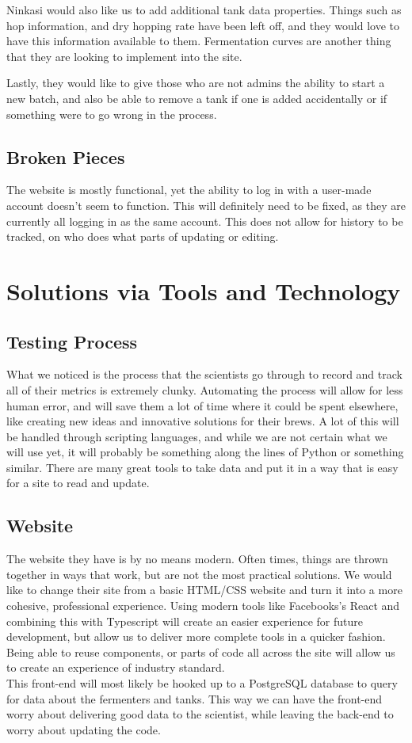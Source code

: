 \documentclass[10pt,peerreview]{IEEEtran}
\begin{document}
    Ninkasi would also like us to add additional tank data properties. Things such as hop information, and dry hopping rate have been left off, and they would love to have this information available to them. Fermentation curves are another thing that they are looking to implement into the site. 
    
    Lastly, they would like to give those who are not admins the ability to start a new batch, and also be able to remove a tank if one is added accidentally or if something were to go wrong in the process.
\subsection{Broken Pieces}
    The website is mostly functional, yet the ability to log in with a user-made account doesn't seem to function. This will definitely need to be fixed, as they are currently all logging in as the same account. This does not allow for history to be tracked, on who does what parts of updating or editing. 
    
\section{Solutions via Tools and Technology}
    \subsection{Testing Process}
        What we noticed is the process that the scientists go through to record and track all of their metrics is extremely clunky. Automating the process will allow for less human error, and will save them a lot of time where it could be spent elsewhere, like creating new ideas and innovative solutions for their brews. A lot of this will be handled through scripting languages, and while we are not certain what we will use yet, it will probably be something along the lines of Python or something similar. There are many great tools to take data and put it in a way that is easy for a site to read and update.
        
    \subsection{Website}
        The website they have is by no means modern. Often times, things are thrown together in ways that work, but are not the most practical solutions. We would like to change their site from a basic HTML/CSS website and turn it into a more cohesive, professional experience. Using modern tools like Facebooks's React and combining this with Typescript will create an easier experience for future development, but allow us to deliver more complete tools in a quicker fashion. Being able to reuse components, or parts of code all across the site will allow us to create an experience of industry standard.\\
        This front-end will most likely be hooked up to a PostgreSQL database to query for data about the fermenters and tanks. This way we can have the front-end worry about delivering good data to the scientist, while leaving the back-end to worry about updating the code.\\
\end{document}
